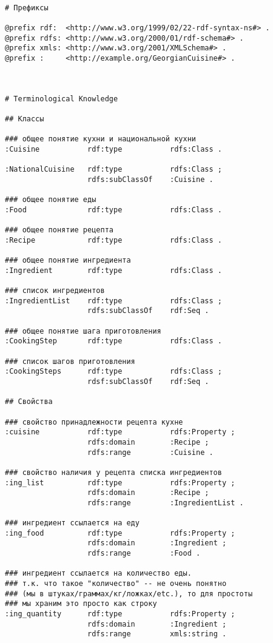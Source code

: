 \documentclass{article}
\begin{document}
\begin{verbatim}

# Префиксы

@prefix rdf:  <http://www.w3.org/1999/02/22-rdf-syntax-ns#> .
@prefix rdfs: <http://www.w3.org/2000/01/rdf-schema#> .
@prefix xmls: <http://www.w3.org/2001/XMLSchema#> .
@prefix :     <http://example.org/GeorgianCuisine#> .



# Terminological Knowledge

## Классы

### общее понятие кухни и национальной кухни
:Cuisine           rdf:type           rdfs:Class .

:NationalCuisine   rdf:type           rdfs:Class ;
                   rdfs:subClassOf    :Cuisine .

### общее понятие еды 
:Food              rdf:type           rdfs:Class .

### общее понятие рецепта
:Recipe            rdf:type           rdfs:Class .

### общее понятие ингредиента
:Ingredient        rdf:type           rdfs:Class .

### список ингредиентов
:IngredientList    rdf:type           rdfs:Class ;
                   rdfs:subClassOf    rdf:Seq .

### общее понятие шага приготовления
:CookingStep       rdf:type           rdfs:Class .

### список шагов приготовления
:CookingSteps      rdf:type           rdfs:Class ;
                   rdsf:subClassOf    rdf:Seq .

## Свойства

### свойство принадлежности рецепта кухне
:cuisine           rdf:type           rdfs:Property ;
                   rdfs:domain        :Recipe ;
                   rdfs:range         :Cuisine .

### свойство наличия у рецепта списка ингредиентов
:ing_list          rdf:type           rdfs:Property ;
                   rdfs:domain        :Recipe ;
                   rdfs:range         :IngredientList .

### ингредиент ссылается на еду
:ing_food          rdf:type           rdfs:Property ;
                   rdfs:domain        :Ingredient ;
                   rdfs:range         :Food .

### ингредиент ссылается на количество еды.
### т.к. что такое "количество" -- не очень понятно
### (мы в штуках/граммах/кг/ложках/etc.), то для простоты
### мы храним это просто как строку
:ing_quantity      rdf:type           rdfs:Property ;
                   rdfs:domain        :Ingredient ;
                   rdfs:range         xmls:string .


\end{verbatim}
\end{document}
